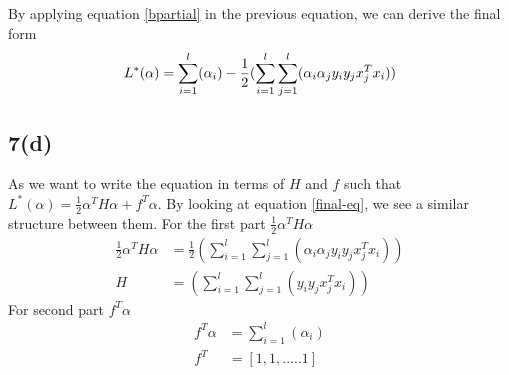 By applying equation \ref{bpartial} in the previous equation, we can derive the final form
\begin{equation}\label{final-eq}
L^*(\alpha) = \sum_{i=1}^l(\alpha_i) - \frac{1}{2}(\sum_{i=1}^l\sum_{j=1}^l(\alpha_i \alpha_j y_i y_j x_j^T x_i))\\
\end{equation}

\subsection*{7(d)}
As we want to write the equation in terms of $H$ and $f$ such that $L^*(\alpha) = \frac{1}{2} \alpha^TH\alpha + f^T\alpha$. By looking at equation \ref{final-eq}, we see a similar structure between them. For the first part $\frac{1}{2} \alpha^TH\alpha $
\begin{equation*}
\begin{aligned}
\frac{1}{2}\alpha^TH\alpha &= \frac{1}{2}(\sum_{i=1}^l\sum_{j=1}^l(\alpha_i \alpha_j y_i y_j x_j^T x_i))\\
H &= (\sum_{i=1}^l\sum_{j=1}^l(y_i y_j x_j^T x_i))
\end{aligned}
\end{equation*}
For second part $f^T\alpha$
\begin{equation*}
\begin{aligned}
f^T\alpha &= \sum_{i=1}^l(\alpha_i)\\
f^T &= [1,1,.....1]
\end{aligned}
\end{equation*}
